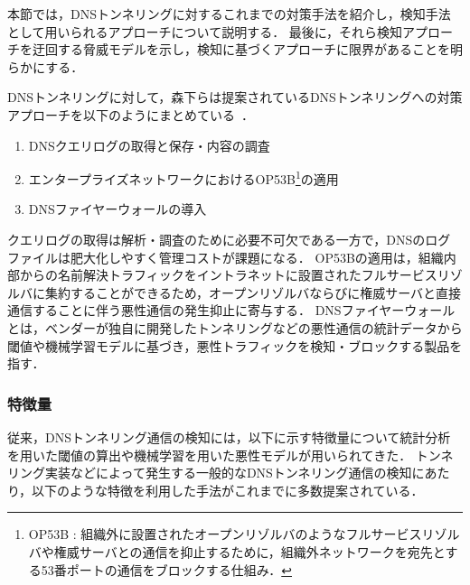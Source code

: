 本節では，DNSトンネリングに対するこれまでの対策手法を紹介し，検知手法として用いられるアプローチについて説明する．
最後に，それら検知アプローチを迂回する脅威モデルを示し，検知に基づくアプローチに限界があることを明らかにする．

DNSトンネリングに対して，森下らは提案されているDNSトンネリングへの対策アプローチを以下のようにまとめている~\cite{morishita}．
\begin{enumerate}
 \item DNSクエリログの取得と保存・内容の調査
 \vspace{-0.5cm}
 \item エンタープライズネットワークにおけるOP53B\footnote{OP53B : 組織外に設置されたオープンリゾルバのようなフルサービスリゾルバや権威サーバとの通信を抑止するために，組織外ネットワークを宛先とする53番ポートの通信をブロックする仕組み．}の適用
 \vspace{-0.5cm}
 \item DNSファイヤーウォールの導入
\end{enumerate}
クエリログの取得は解析・調査のために必要不可欠である一方で，DNSのログファイルは肥大化しやすく管理コストが課題になる．
OP53Bの適用は，組織内部からの名前解決トラフィックをイントラネットに設置されたフルサービスリゾルバに集約することができるため，オープンリゾルバならびに権威サーバと直接通信することに伴う悪性通信の発生抑止に寄与する．
DNSファイヤーウォールとは，ベンダーが独自に開発したトンネリングなどの悪性通信の統計データから閾値や機械学習モデルに基づき，悪性トラフィックを検知・ブロックする製品を指す．

\subsubsection{特徴量}
\label{sec:pre-tunnel-feature}
従来，DNSトンネリング通信の検知には，以下に示す特徴量について統計分析を用いた閾値の算出や機械学習を用いた悪性モデルが用いられてきた．
トンネリング実装などによって発生する一般的なDNSトンネリング通信の検知にあたり，以下のような特徴を利用した手法がこれまでに多数提案されている．\newline


